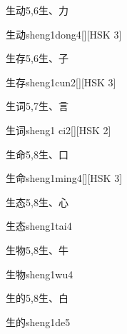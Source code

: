 \begin{entry}{生动}{5,6}{⽣、⼒}
  \begin{phonetics}{生动}{sheng1dong4}[][HSK 3]
  \end{phonetics}
\end{entry}

\begin{entry}{生存}{5,6}{⽣、⼦}
  \begin{phonetics}{生存}{sheng1cun2}[][HSK 3]
  \end{phonetics}
\end{entry}

\begin{entry}{生词}{5,7}{⽣、⾔}
  \begin{phonetics}{生词}{sheng1 ci2}[][HSK 2]
  \end{phonetics}
\end{entry}

\begin{entry}{生命}{5,8}{⽣、⼝}
  \begin{phonetics}{生命}{sheng1ming4}[][HSK 3]
  \end{phonetics}
\end{entry}

\begin{entry}{生态}{5,8}{⽣、⼼}
  \begin{phonetics}{生态}{sheng1tai4}
  \end{phonetics}
\end{entry}

\begin{entry}{生物}{5,8}{⽣、⽜}
  \begin{phonetics}{生物}{sheng1wu4}
  \end{phonetics}
\end{entry}

\begin{entry}{生的}{5,8}{⽣、⽩}
  \begin{phonetics}{生的}{sheng1de5}
  \end{phonetics}
\end{entry}

